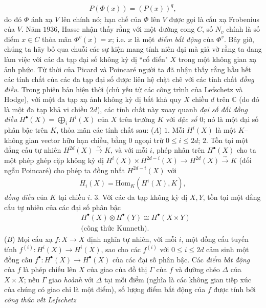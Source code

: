 \begin{multicols}{2}
	\begin{align*}
		P(\Phi(x)) = (P(x))^q,
	\end{align*}
	do đó $\Phi$ ánh xạ $V$ lên chính nó; hạn chế của $\Phi$ lên $V$ được gọi là cấu xạ Frobenius của $V$. Năm $1936$, Hasse nhận thấy rằng với một đường cong $C$, số $N_v$ chính là số điểm $x \in C$ thỏa mãn $\Phi^v(x) = x$; i.e. $x$ là một \textit{điểm bất động} của $\Phi^v$. Bây giờ, chúng ta hãy bỏ qua chuỗi các sự kiện mang tính niên đại mà giả vờ rằng ta đang làm việc với các đa tạp đại số không kỳ dị ``cổ điển" $X$ trong một không gian xạ ảnh phức. Từ thời của Picard và  Poincaré người ta đã nhận thấy rằng hầu hết các tính chất của các đa tạp đại số được liên hệ chặt chẽ với các tính chất \textit{đồng điều}. Trong phiên bản hiện thời (chủ yếu từ các công trình của Lefschetz và Hodge), với một đa tạp xạ ảnh không kỳ dị bất khả quy $X$ chiều $d$ trên $\mathbb{C}$ (do đó là một đa tạp khả vi chiều $2d$), các tính chất này xoay quanh \textit{đại số đối đồng điều} $H^{\bullet}(X) = \bigoplus_i H^i(X)$ của $X$ trên trường $K$ với \textit{đặc số} $0$; nó là một đại số phân bậc trên $K$, thỏa mãn các tính chất sau:
	\vskip 0.1cm
	($A$) $1.$ Mỗi $H^i(X)$ là một $K$--không gian vector hữu hạn chiều, bằng $0$ ngoại trừ $0 \leq i \leq 2d$;
	\vskip 0.1cm
	$2.$ Tồn tại một đẳng cấu tự nhiên $H^{2d}(X) \overset{\sim}{\longrightarrow} K$, và với mỗi $i$, phép nhân trên $H^{\bullet}(X)$ cho ta một phép ghép cặp không kỳ dị $H^{i}(X) \times H^{2d-i}(X) \to H^{2d}(X) \overset{\sim}{\longrightarrow} K$ (đối ngẫu Poincaré) cho phép ta đồng nhất $H^{2d-i}(X)$ với 
	\begin{align*} 
		H_i(X) = \mathrm{Hom}_K(H^i(X),K),
	\end{align*} 
	\textit{đồng điều} của $K$ tại chiều $i$.
	\vskip 0.1cm
	$3.$ Với các đa tạp không kỳ dị $X, Y$, tồn tại một đẳng cấu tự nhiên của các đại số phân bậc 
	\begin{align*} 
		&H^{\bullet}(X) \otimes H^{\bullet}(Y) \cong H^{\bullet}(X \times Y) \\
		&\text{(công thức Kunneth)}.
	\end{align*}
	($B$) Mọi cấu xạ $f: X \to X$ định nghĩa tự nhiên, với mỗi $i$, một đồng cấu tuyến tính $f^{(i)}:H^i(X) \to H^i(X)$, sao cho các $f^{(i)}$ với $0 \leq i \leq 2d$ cảm sinh một đồng cấu $f^{\bullet}:H^{\bullet}(X) \to H^{\bullet}(X)$ của các đại số phân bậc. Các \textit{điểm bất động} của $f$ là phép chiếu lên $X$ của giao của đồ thị $\Gamma$ của $f$ và đường chéo $\Delta$ của $X \times X$; nếu $\Gamma$ giao \textit{hoành} với $\Delta$ tại mỗi điểm (nghĩa là các không gian tiếp xúc của chúng có giao chỉ là một điểm), số lượng điểm bất động của $f$ được tính bởi \textit{công thức vết Lefschetz}

\end{multicols}
